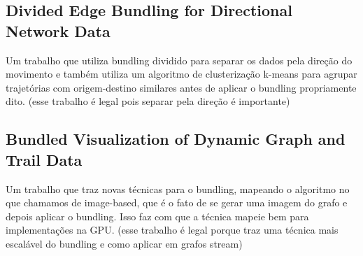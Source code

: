 \subsection{Divided Edge Bundling for Directional Network Data}
  Um trabalho que utiliza bundling dividido para separar os dados pela direção
do movimento e também utiliza um algoritmo de clusterização k-means para agrupar
trajetórias com origem-destino similares antes de aplicar o bundling propriamente
dito. (esse trabalho é legal pois separar pela direção é importante)

\subsection{Bundled Visualization of Dynamic Graph and Trail Data}
  Um trabalho que traz novas técnicas para o bundling, mapeando o algoritmo
no que chamamos de image-based, que é o fato de se gerar uma imagem do grafo
e depois aplicar o bundling. Isso faz com que a técnica mapeie bem para implementações
na GPU. (esse trabalho é legal porque traz uma técnica mais escalável do bundling e como
aplicar em grafos stream)

%
%
%  
%
%

